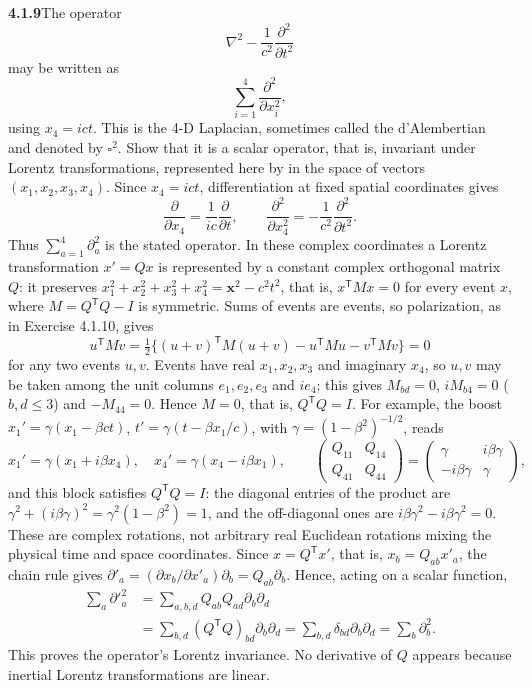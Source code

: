 \par\bigskip
\noindent\textbf{4.1.9}\quad The operator
\[
\nabla^{2}-\frac{1}{c^{2}}\frac{\partial^{2}}{\partial t^{2}}
\]
may be written as
\[
\sum_{i=1}^{4}\frac{\partial^{2}}{\partial x_{i}^{2}},
\]
using $x_{4}=ict$. This is the 4-D Laplacian, sometimes called the
d'Alembertian and denoted by $\square^{2}$. Show that it is a scalar operator,
that is, invariant under Lorentz transformations, represented here by
 in the space of vectors $(x_{1},x_{2},x_{3},x_{4})$.
\solution
Since $x_4=ict$, differentiation at fixed spatial coordinates gives
\[
\frac{\partial}{\partial x_4}=\frac{1}{ic}\frac{\partial}{\partial t},
\qquad
\frac{\partial^2}{\partial x_4^2}
=-\frac{1}{c^2}\frac{\partial^2}{\partial t^2}.
\]
Thus $\sum_{a=1}^4\partial_a^2$ is the stated operator. In these complex
coordinates a Lorentz transformation $x'=Qx$ is represented by a
constant complex orthogonal matrix $Q$: it preserves
$x_1^2+x_2^2+x_3^2+x_4^2=\mathbf{x}^2-c^2t^2$, that is,
$x^{\mathsf T}Mx=0$ for every event $x$, where $M=Q^{\mathsf T}Q-I$ is
symmetric. Sums of events are events, so polarization, as in
Exercise 4.1.10, gives
\[
u^{\mathsf T}Mv=\tfrac12\{(u+v)^{\mathsf T}M(u+v)-u^{\mathsf T}Mu
-v^{\mathsf T}Mv\}=0
\]
for any two events $u,v$. Events have real $x_1,x_2,x_3$ and imaginary
$x_4$, so $u,v$ may be taken among the unit columns $e_1,e_2,e_3$ and
$ie_4$; this gives $M_{bd}=0$, $iM_{b4}=0$ ($b,d\le3$) and $-M_{44}=0$.
Hence $M=0$, that is, $Q^{\mathsf T}Q=I$. For example, the boost
$x_1'=\gamma(x_1-\beta ct)$, $t'=\gamma(t-\beta x_1/c)$, with
$\gamma=(1-\beta^2)^{-1/2}$, reads
\[
x_1'=\gamma(x_1+i\beta x_4),\quad x_4'=\gamma(x_4-i\beta x_1),
\qquad
\begin{pmatrix}Q_{11}&Q_{14}\\Q_{41}&Q_{44}\end{pmatrix}
=\begin{pmatrix}\gamma&i\beta\gamma\\-i\beta\gamma&\gamma\end{pmatrix},
\]
and this block satisfies $Q^{\mathsf T}Q=I$: the diagonal entries of
the product are $\gamma^2+(i\beta\gamma)^2=\gamma^2(1-\beta^2)=1$, and
the off-diagonal ones are $i\beta\gamma^2-i\beta\gamma^2=0$.
These are complex rotations, not arbitrary real
Euclidean rotations mixing the physical time and space coordinates.
Since $x=Q^{\mathsf T}x'$, that is, $x_b=Q_{ab}x'_a$, the chain rule gives
$\partial'_a=(\partial x_b/\partial x'_a)\partial_b=Q_{ab}\partial_b$.
Hence, acting on a scalar function,
\begin{align*}
\sum_a\partial'^2_a
&=\sum_{a,b,d}Q_{ab}Q_{ad}\partial_b\partial_d\\
&=\sum_{b,d}(Q^{\mathsf T}Q)_{bd}\partial_b\partial_d
 =\sum_{b,d}\delta_{bd}\partial_b\partial_d
 =\sum_b\partial_b^2.
\end{align*}
This proves the operator's Lorentz invariance. No derivative of $Q$
appears because inertial Lorentz transformations are linear.

